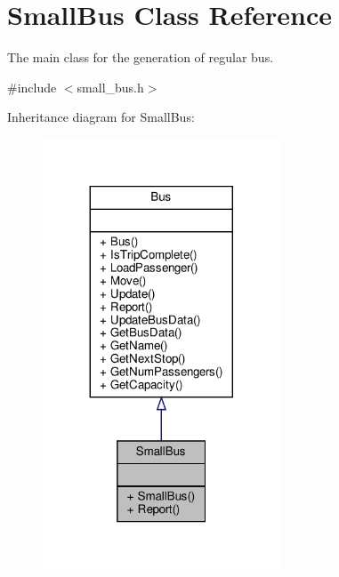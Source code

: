 \hypertarget{classSmallBus}{}\section{Small\+Bus Class Reference}
\label{classSmallBus}


The main class for the generation of regular bus.  




{\ttfamily \#include $<$small\+\_\+bus.\+h$>$}



Inheritance diagram for Small\+Bus\+:
\nopagebreak
\begin{figure}[H]
\begin{center}
\leavevmode
\includegraphics[width=200pt]{classSmallBus__inherit__graph}
\end{center}
\end{figure}


